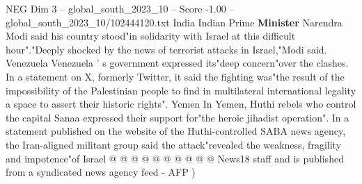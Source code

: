 \begin{textsample}{NEG Dim 3 – global\_south\_2023\_10 – Score -1.00 – global\_south\_2023\_10/102444120.txt}
India Indian Prime \textbf{Minister} Narendra Modi said his country stood"in solidarity with Israel at this difficult hour"."Deeply shocked by the news of terrorist attacks in Israel,"Modi said.
Venezuela Venezuela ' s government expressed its"deep concern"over the clashes.
In a statement on X, formerly Twitter, it said the fighting was"the result of the impossibility of the Palestinian people to find in multilateral international legality a space to assert their historic rights".
Yemen In Yemen, Huthi rebels who control the capital Sanaa expressed their support for"the heroic jihadist operation".
In a statement published on the website of the Huthi-controlled SABA news agency, the Iran-aligned militant group said the attack"revealed the weakness, fragility and impotence"of Israel @ @ @ @ @ @ @ @ @ @ News18 staff and is published from a syndicated news agency feed - AFP )

\end{textsample}
